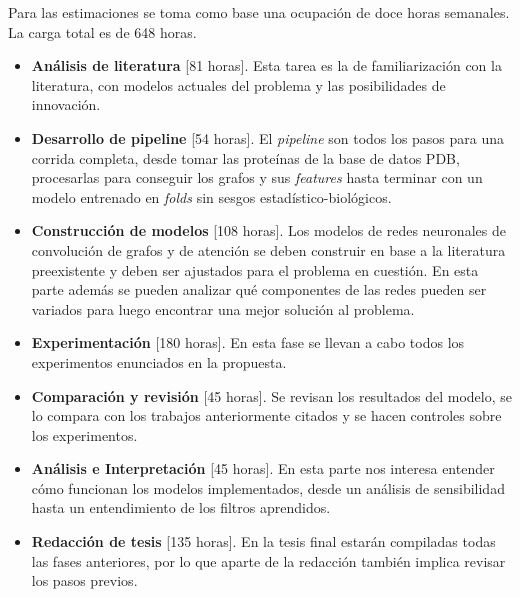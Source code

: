 \documentclass[
    left=2.0cm,         %
    right=2.0cm,        %
    top=2.0cm,          %
    bottom=2.5cm,         %
    bindingoffset=6mm,  %
    nohyphenation=false %
]{eiti/eiti-thesis}
\begin{document}
Para las estimaciones se toma como base una ocupación de doce horas semanales. La carga total es de 648 horas.

\begin{itemize}
 \renewcommand{\labelitemi}{\scriptsize$\blacksquare$}
 \item  \textbf{Análisis de literatura} [81 horas]. Esta tarea es la de familiarización con la literatura, con
 modelos actuales del problema y las posibilidades de innovación.
 \item  \textbf{Desarrollo de pipeline} [54 horas]. El \textit{pipeline} son todos los
 pasos para una corrida completa, desde tomar las proteínas de la base de datos PDB,
 procesarlas para conseguir los grafos y sus \textit{features} hasta terminar con
 un modelo entrenado en \textit{folds} sin sesgos estadístico-biológicos.
 \item  \textbf{Construcción de modelos} [108 horas].   Los modelos de redes
 neuronales de convolución de grafos y de atención se deben construir en base a la
 literatura preexistente y deben ser ajustados para el problema en cuestión. En 
 esta parte además se pueden analizar qué componentes de las redes pueden ser variados
 para luego encontrar una mejor solución al problema.
 \item  \textbf{Experimentación} [180 horas]. En esta fase se llevan a cabo
 todos los experimentos enunciados en la propuesta.
 \item  \textbf{Comparación y revisión} [45 horas]. Se revisan los resultados del modelo,
 se lo compara con los trabajos anteriormente citados y se hacen controles sobre
 los experimentos.
 \item  \textbf{Análisis e Interpretación} [45 horas]. En esta parte nos interesa
 entender cómo funcionan los modelos implementados, desde un análisis de sensibilidad
 hasta un entendimiento de los filtros aprendidos.
 \item  \textbf{Redacción de tesis} [135 horas]. En la tesis final estarán compiladas
 todas las fases anteriores, por lo que aparte de la redacción también implica revisar
 los pasos previos.
\end{itemize}



\newpage
\printbibliography

\newpage
\end{document}
